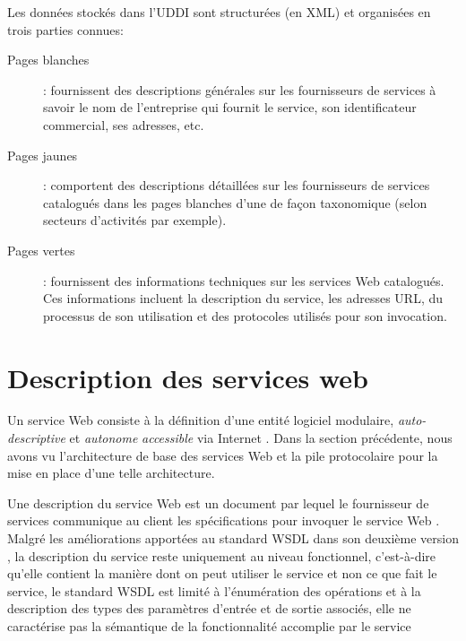   Les données stockés dans l'\textsc{UDDI} sont structurées (en
  \textsc{XML}) et organisées en trois parties connues:

  \SpecialItem
  \begin{description}
    \item[Pages blanches]: fournissent des descriptions générales sur
      les fournisseurs de services à savoir le nom de l'entreprise qui
      fournit le service, son identificateur commercial, ses adresses,
      etc.

    \item[Pages jaunes]: comportent des descriptions détaillées sur
      les fournisseurs de services catalogués dans les pages blanches
      d'une de façon taxonomique (selon secteurs d'activités par
      exemple).

    \item[Pages vertes]: fournissent des informations techniques sur
      les services Web catalogués. Ces informations incluent la
      description du service, les adresses \textsc{URL}, du processus
      de son utilisation et des protocoles utilisés pour son
      invocation.
  \end{description}



\section{Description des services web}
\label{sec:ws-description}

Un service Web consiste à la définition d'une entité logiciel
modulaire, \textit{auto-descriptive} et \textit{autonome}
\textit{accessible} via Internet \cite{curbera2001web}. Dans la
section précédente, nous avons vu l'architecture de base des services
Web et la pile protocolaire pour la mise en place d'une telle
architecture.



Une description du service Web est un document par lequel le
fournisseur de services communique au client les spécifications pour
invoquer le service Web \cite{lopez2008selection}. Malgré les
améliorations apportées au standard \textsc{WSDL} dans son deuxième
version \cite{chinnici2007web}, la description du service reste
uniquement au niveau fonctionnel, c'est-à-dire qu'elle contient la
manière dont on peut utiliser le service et non ce que fait le
service, le standard \textsc{WSDL} est limité à l'énumération des
opérations et à la description des types des paramètres d'entrée et de
sortie associés, elle ne caractérise pas la sémantique de la
fonctionnalité accomplie par le service

